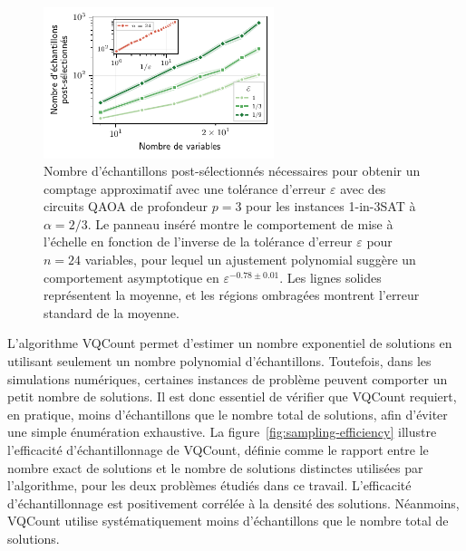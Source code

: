 \begin{figure}[H]
    \centering
    \includegraphics[width=0.6\textwidth]{figures/1in3sat-scaling.pdf}
    \caption[Comportement d'échelle du nombre d'échantillons post-sélectionnés pour \#1-in-3SAT]{Nombre d'échantillons post-sélectionnés nécessaires pour obtenir un comptage approximatif avec une tolérance d'erreur $\varepsilon$ avec des circuits QAOA de profondeur $p=3$ pour les instances 1-in-3SAT à $\alpha=2/3$. Le panneau inséré montre le comportement de mise à l'échelle en fonction de l'inverse de la tolérance d'erreur $\varepsilon$ pour $n=24$ variables, pour lequel un ajustement polynomial suggère un comportement asymptotique en $\varepsilon^{-0.78 \pm 0.01}$. Les lignes solides représentent la moyenne, et les régions ombragées montrent l'erreur standard de la moyenne.}
    \label{fig:1in3sat-scaling}
\end{figure}

L'algorithme VQCount permet d'estimer un nombre exponentiel de solutions en utilisant seulement un nombre polynomial d'échantillons. Toutefois, dans les simulations numériques, certaines instances de problème peuvent comporter un petit nombre de solutions. Il est donc essentiel de vérifier que VQCount requiert, en pratique, moins d'échantillons que le nombre total de solutions, afin d'éviter une simple énumération exhaustive. La figure~\ref{fig:sampling-efficiency} illustre l'efficacité d'échantillonnage de VQCount, définie comme le rapport entre le nombre exact de solutions et le nombre de solutions distinctes utilisées par l'algorithme, pour les deux problèmes étudiés dans ce travail. L'efficacité d'échantillonnage est positivement corrélée à la densité des solutions. Néanmoins, VQCount utilise systématiquement moins d'échantillons que le nombre total de solutions.

